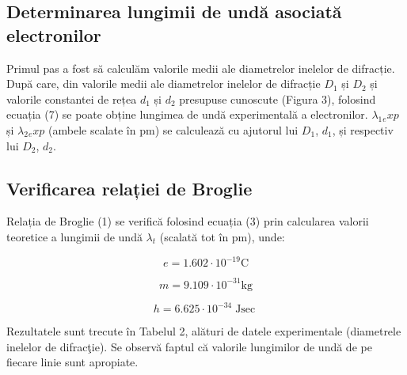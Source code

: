\documentclass{article}
\begin{document}
\subsection{Determinarea lungimii de undă asociată electronilor}

\makebox[1cm]{} Primul pas a fost să calculăm valorile medii ale diametrelor inelelor de difracție.
După care, din valorile medii ale diametrelor inelelor de difracție ${D}{_1}$ și ${D}{_2}$ și valorile constantei de rețea ${d}{_1}$ și ${d}{_2}$
presupuse cunoscute (Figura 3), folosind ecuația (7) se poate obține lungimea de undă experimentală a electronilor.
${\lambda}{_{1}{_exp}}$ și ${\lambda}{_{2}{_exp}}$ (ambele scalate în pm) se calculează cu ajutorul lui ${D}{_1}$, ${d}{_1}$, și respectiv lui ${D}{_2}$, ${d}{_2}$.

\subsection{Verificarea relației de Broglie}

\makebox[1cm]{} Relația de Broglie (1) se verifică folosind ecuația (3) prin calcularea valorii teoretice a lungimii de
undă ${\lambda}{_t}$ (scalată tot în pm), unde:

\begin{equation*}
    e = 1.602 \cdot 10^{-19} \si{\coulomb}
\end{equation*}

\begin{equation*}
    m = 9.109 \cdot 10^{-31} \si{\kilogram}
\end{equation*}

\begin{equation*}
    h = 6.625 \cdot 10^{-34} \si{\joule\sec}
\end{equation*}

\makebox[1cm]{} Rezultatele sunt trecute în Tabelul 2, alături de datele experimentale (diametrele inelelor de difracţie). Se observă faptul că valorile lungimilor de undă de pe fiecare linie sunt apropiate.
\end{document}
